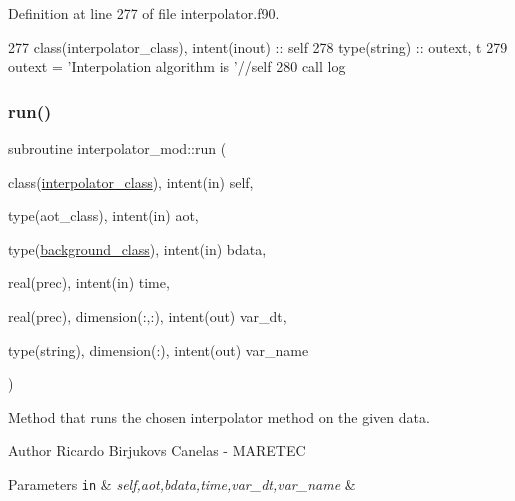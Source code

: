 Definition at line 277 of file interpolator.\+f90.


\begin{DoxyCode}
277     \textcolor{keywordtype}{class}(interpolator\_class), \textcolor{keywordtype}{intent(inout)} :: self
278     \textcolor{keywordtype}{type}(string) :: outext, t
279     outext = \textcolor{stringliteral}{'Interpolation algorithm is '}//self%
280     \textcolor{keyword}{call }log%
\end{DoxyCode}
\mbox{\label{namespaceinterpolator__mod_a1c98c171b308ef58850102f67abcca95}} 
\subsubsection{\texorpdfstring{run()}{run()}}
{\footnotesize\ttfamily subroutine interpolator\+\_\+mod\+::run (\begin{DoxyParamCaption}\item[{class(\mbox{\hyperlink{structinterpolator__mod_1_1interpolator__class}{interpolator\+\_\+class}}), intent(in)}]{self,  }\item[{type(aot\+\_\+class), intent(in)}]{aot,  }\item[{type(\mbox{\hyperlink{structbackground__mod_1_1background__class}{background\+\_\+class}}), intent(in)}]{bdata,  }\item[{real(prec), intent(in)}]{time,  }\item[{real(prec), dimension(\+:,\+:), intent(out)}]{var\+\_\+dt,  }\item[{type(string), dimension(\+:), intent(out)}]{var\+\_\+name }\end{DoxyParamCaption})\hspace{0.3cm}{\ttfamily [private]}}



Method that runs the chosen interpolator method on the given data. 

\begin{DoxyAuthor}{Author}
Ricardo Birjukovs Canelas -\/ M\+A\+R\+E\+T\+EC 
\end{DoxyAuthor}

\begin{DoxyParams}[1]{Parameters}
\mbox{\tt in}  & {\em self,aot,bdata,time,var\+\_\+dt,var\+\_\+name} & \\
\hline
\end{DoxyParams}


